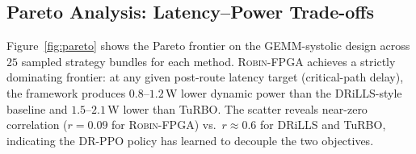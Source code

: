 \documentclass[journal]{IEEEtran}
\begin{document}
\subsection{Pareto Analysis: Latency--Power Trade-offs}
\label{sec:pareto}

Figure~\ref{fig:pareto} shows the Pareto frontier on the GEMM-systolic design across $25$ sampled strategy bundles for each method. \textsc{Robin-FPGA} achieves a strictly dominating frontier: at any given post-route latency target (critical-path delay), the framework produces $0.8$--$1.2$\,W lower dynamic power than the DRiLLS-style baseline and $1.5$--$2.1$\,W lower than TuRBO. The scatter reveals near-zero correlation ($r=0.09$ for \textsc{Robin-FPGA}) vs.\ $r \approx 0.6$ for DRiLLS and TuRBO, indicating the DR-PPO policy has learned to decouple the two objectives.
\end{document}
